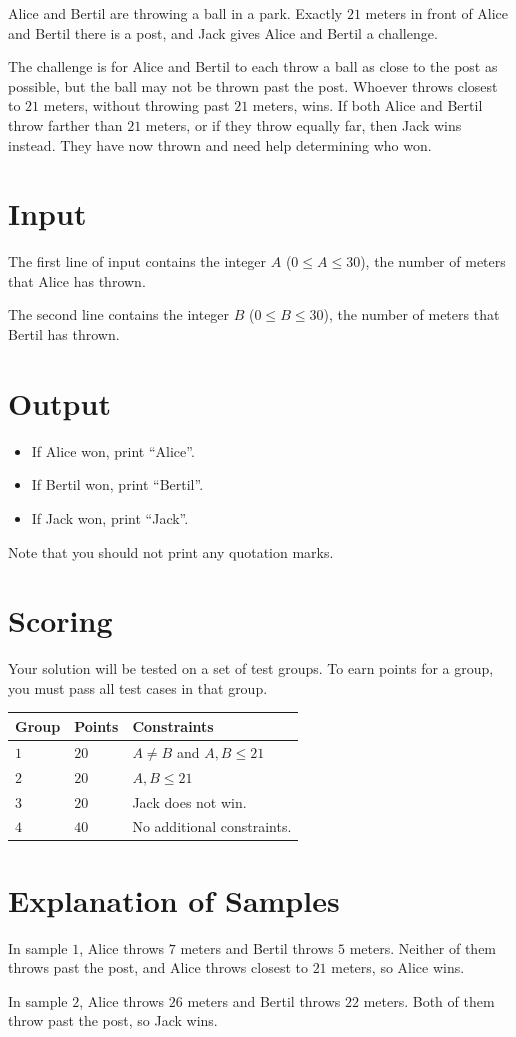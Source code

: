 Alice and Bertil are throwing a ball in a park. Exactly $21$ meters in front of Alice and Bertil there is a post, and Jack gives Alice and Bertil a challenge.

The challenge is for Alice and Bertil to each throw a ball as close to the post as possible, but the ball may not be thrown past the post.
Whoever throws closest to $21$ meters, without throwing past $21$ meters, wins. If both Alice and Bertil throw farther than $21$ meters, or if they throw equally far, then Jack wins instead.
They have now thrown and need help determining who won.

\section*{Input}
The first line of input contains the integer $A$ ($0 \leq A \leq 30$),
the number of meters that Alice has thrown.

The second line contains the integer $B$ ($0 \leq B \leq 30$),
the number of meters that Bertil has thrown.

\section*{Output}

\begin{itemize}
  \item If Alice won, print ``Alice''.
  \item If Bertil won, print ``Bertil''.
  \item If Jack won, print ``Jack''.
\end{itemize}
Note that you should not print any quotation marks.

\section*{Scoring}
Your solution will be tested on a set of test groups.
To earn points for a group, you must pass all test cases in that group.

\noindent
\begin{tabular}{| l | l | p{12cm} |}
  \hline
  \textbf{Group} & \textbf{Points} & \textbf{Constraints} \\ \hline
  $1$    & $20$       & $A \neq B$ and $A, B \leq 21$ \\ \hline
  $2$    & $20$       & $A, B \leq 21$ \\ \hline
  $3$    & $20$       & Jack does not win. \\ \hline
  $4$    & $40$       & No additional constraints. \\ \hline
\end{tabular}

\section*{Explanation of Samples}
In sample $1$, Alice throws $7$ meters and Bertil throws $5$ meters.
Neither of them throws past the post, and Alice throws closest to $21$ meters, so Alice wins.

In sample $2$, Alice throws $26$ meters and Bertil throws $22$ meters.
Both of them throw past the post, so Jack wins.
